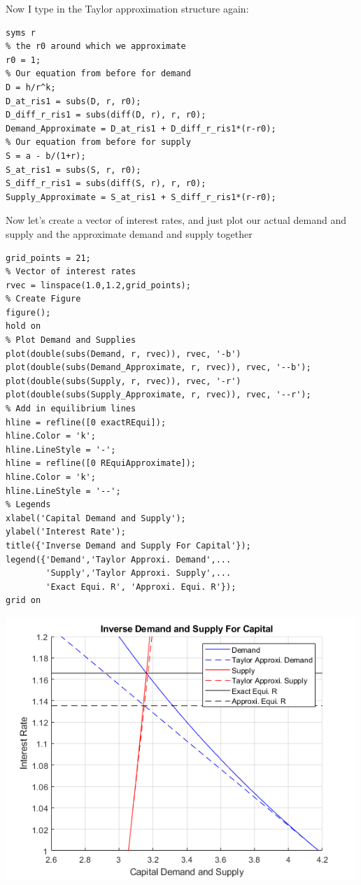 \documentclass[
]{book}
\begin{document}
Now I type in the Taylor approximation structure again:

\begin{verbatim}
syms r
% the r0 around which we approximate
r0 = 1;
% Our equation from before for demand
D = h/r^k;
D_at_ris1 = subs(D, r, r0);
D_diff_r_ris1 = subs(diff(D, r), r, r0);
Demand_Approximate = D_at_ris1 + D_diff_r_ris1*(r-r0);
% Our equation from before for supply
S = a - b/(1+r);
S_at_ris1 = subs(S, r, r0);
S_diff_r_ris1 = subs(diff(S, r), r, r0);
Supply_Approximate = S_at_ris1 + S_diff_r_ris1*(r-r0);
\end{verbatim}

Now let's create a vector of interest rates, and just plot our actual
demand and supply and the approximate demand and supply together

\begin{verbatim}
grid_points = 21;
% Vector of interest rates
rvec = linspace(1.0,1.2,grid_points);
% Create Figure
figure();
hold on
% Plot Demand and Supplies
plot(double(subs(Demand, r, rvec)), rvec, '-b')
plot(double(subs(Demand_Approximate, r, rvec)), rvec, '--b');
plot(double(subs(Supply, r, rvec)), rvec, '-r')
plot(double(subs(Supply_Approximate, r, rvec)), rvec, '--r');
% Add in equilibrium lines
hline = refline([0 exactREqui]);
hline.Color = 'k';
hline.LineStyle = '-';
hline = refline([0 REquiApproximate]);
hline.Color = 'k';
hline.LineStyle = '--';
% Legends
xlabel('Capital Demand and Supply');
ylabel('Interest Rate');
title({'Inverse Demand and Supply For Capital'});
legend({'Demand','Taylor Approxi. Demand',...
        'Supply','Taylor Approxi. Supply',...
        'Exact Equi. R', 'Approxi. Equi. R'});
grid on
\end{verbatim}

\includegraphics[width=5.20833in,height=\textheight]{img/demand_supply_taylor_approximate_capital_images/figure_0.png}
\end{document}
